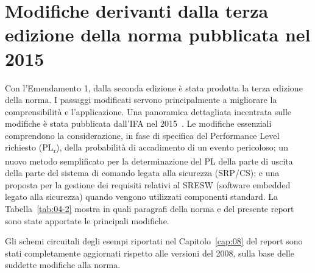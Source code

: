 \section{Modifiche derivanti dalla terza edizione della norma pubblicata nel 2015}
\label{sec:04-4}
Con l'Emendamento 1, dalla seconda edizione è stata prodotta la terza edizione della norma. I passaggi modificati servono principalmente a migliorare la comprensibilità e l'applicazione. Una panoramica dettagliata incentrata sulle modifiche è stata pubblicata dall'IFA nel 2015~\cite{hauke2015}. Le modifiche essenziali comprendono la considerazione, in fase di specifica del Performance Level richiesto (PL\textsubscript{\small r}), della probabilità di accadimento di un evento pericoloso; un nuovo metodo semplificato per la determinazione del PL della parte di uscita della parte del sistema di comando legata alla sicurezza (SRP/CS); e una proposta per la gestione dei requisiti relativi al SRESW (software embedded legato alla sicurezza) quando vengono utilizzati componenti standard. La Tabella~\ref{tab:04-2} mostra in quali paragrafi della norma e del presente report sono state apportate le principali modifiche.

Gli schemi circuitali degli esempi riportati nel Capitolo~\ref{cap:08} del report sono stati completamente aggiornati rispetto alle versioni del 2008, sulla base delle suddette modifiche alla norma.

